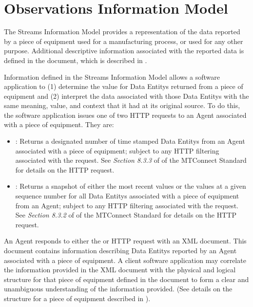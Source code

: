 
\section{Observations Information Model}
\label{sec:Observations Information Model}

The \gls{Streams Information Model} provides a representation of the data reported by a piece of equipment used for a manufacturing process, or used for any other purpose.  Additional descriptive information associated with the reported data is defined in the  document, which is described in .

Information defined in the \gls{Streams Information Model} allows a software application to (1) determine the value for \glspl{Data Entity} returned from a piece of equipment and (2) interpret the data associated with those \glspl{Data Entity} with the same meaning, value, and context that it had at its original source.  To do this, the software application issues one of two HTTP requests to an \gls{Agent} associated with a piece of equipment.  They are:


\begin{itemize}
\item {}:  Returns a designated number of time stamped \glspl{Data Entity} from an \gls{Agent} associated with a piece of equipment; subject to any HTTP filtering associated with the request.  See \textit{Section 8.3.3} of  of the MTConnect Standard for details on the  HTTP request.

\item {}:  Returns a snapshot of either the most recent values or the values at a given sequence number for all \glspl{Data Entity} associated with a piece of equipment from an \gls{Agent}; subject to any HTTP filtering associated with the request.  See \textit{Section 8.3.2} of  of the MTConnect Standard for details on the  HTTP request.
\end{itemize}

An \gls{Agent} responds to either the  or  HTTP request with an \linebreak{} \gls{XML} document.  This document contains information describing \glspl{Data Entity} reported by an \gls{Agent} associated with a piece of equipment.   A client software application may correlate the information provided in the  \gls{XML} document with the physical and logical structure for that piece of equipment defined in the  document to form a clear and unambiguous understanding of the information provided.  (See details on the structure for a piece of equipment described in ).

